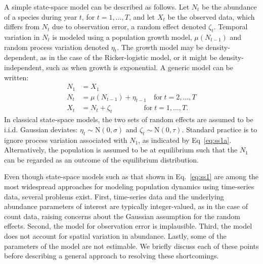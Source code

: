 \documentclass[12pt]{article}
\begin{document}
A simple state-space model can be described as follows.
Let $N_t$ be the abundance of a species during year $t$, for
$t=1,\hdots,T$, and let $X_t$ be
the observed data, which differs from $N_t$ due to observation error,
a random effect denoted $\zeta_t$. Temporal variation in $N_t$ is
modeled using a population growth model, $\mu(N_{t-1})$
and random process variation denoted $\eta_t$.
The growth model may be density-dependent, as in the case of the 
Ricker-logistic model, or it might be density-independent, such as when growth
is exponential.
A generic model can be written: %
\begin{subequations}
  \label{eq:ss1}
  \begin{align}
    N_1 &= X_1 \label{eq:ss1a} \\
N_t &= \mu(N_{t-1}) + \eta_{t-1} \quad \text{for} \;
t=2,\hdots,T \label{eq:ss1b} \\
X_t &= N_t + \zeta_t \qquad \qquad \;\, \text{for} \;
t=1,\hdots,T. \label{eq:ss1c}
  \end{align}
\end{subequations}
In classical
state-space models, the two sets of random effects
are assumed to be i.i.d. Gaussian deviates:
$\eta_t \sim \mathrm{N}(0, \sigma)$ and
$\zeta_t \sim \mathrm{N}(0, \tau)$. Standard practice is to
ignore process variation associated with $N_1$, as
indicated by Eq~\ref{eq:ss1a}. Alternatively, the population is
assumed to be at equilibrium such that the $N_1$ can be regarded as an
outcome of the equilibrium distribution.

Even though state-space models such as that shown in Eq.~\ref{eq:ss1}
are among the most widespread approaches for modeling population dynamics
using time-series data, several problems exist. First,
time-series data and the underlying abundance parameters of interest
are typically integer-valued, as in the case of count data, raising
concerns about the Gaussian assumption for the random
effects. Second, the model for observation error is implausible. %
Third, the model does not account for spatial variation in abundance. Lastly, some of the
parameters of the model are not estimable. We briefly discuss each of
these points before describing a general approach to resolving these
shortcomings.
\end{document}
